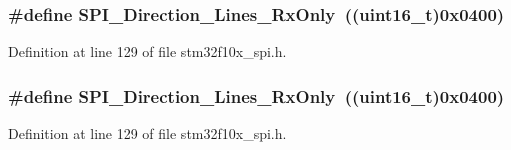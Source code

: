\subsubsection[{\texorpdfstring{S\+P\+I\+\_\+\+Direction\+\_\+2\+Lines\+\_\+\+Rx\+Only}{SPI_Direction_2Lines_RxOnly}}]{\setlength{\rightskip}{0pt plus 5cm}\#define S\+P\+I\+\_\+\+Direction\+\_\+Lines\+\_\+\+Rx\+Only~(({\bf uint16\+\_\+t})0x0400)}\hypertarget{group___s_p_i__data__direction_gab8ab942f7240394f50e4c86c5288516a}{}\label{group___s_p_i__data__direction_gab8ab942f7240394f50e4c86c5288516a}


Definition at line 129 of file stm32f10x\+\_\+spi.\+h.

\subsubsection[{\texorpdfstring{S\+P\+I\+\_\+\+Direction\+\_\+2\+Lines\+\_\+\+Rx\+Only}{SPI_Direction_2Lines_RxOnly}}]{\setlength{\rightskip}{0pt plus 5cm}\#define S\+P\+I\+\_\+\+Direction\+\_\+Lines\+\_\+\+Rx\+Only~(({\bf uint16\+\_\+t})0x0400)}\hypertarget{group___s_p_i__data__direction_gab8ab942f7240394f50e4c86c5288516a}{}\label{group___s_p_i__data__direction_gab8ab942f7240394f50e4c86c5288516a}


Definition at line 129 of file stm32f10x\+\_\+spi.\+h.

